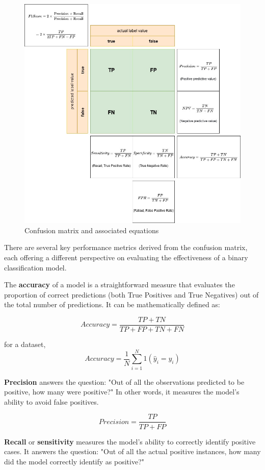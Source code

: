 		\begin{figure}[H]
			\centering
			\includegraphics[width=0.9\linewidth]{img/confusion_matrix}
			\caption{Confusion matrix and associated equations}
			\label{fig:confusionmatrix}
		\end{figure}
		
		
		There are several key performance metrics derived from the confusion matrix, each offering a different perspective on evaluating the effectiveness of a binary classification model.
		
		\bigskip
		
		The \textbf{accuracy} of a model is a straightforward measure that evaluates the proportion of correct predictions (both True Positives and True Negatives) out of the total number of predictions. It can be mathematically defined as:
		
		
		$$Accuracy=\frac{TP+TN}{TP+FP+TN+FN}$$
		
		for a dataset,
		$$
		Accuracy = \frac{1}{N} \sum_{i=1}^{N} 1(\hat{y}_i = y_i)
		$$
		
		
		\textbf{Precision} answers the question: "Out of all the observations predicted to be positive, how many were positive?" In other words, it measures the model's ability to avoid false positives.
		
		$$Precision=\frac{TP}{TP+FP}$$
		
		
		\textbf{Recall} or \textbf{sensitivity} measures the model's ability to correctly identify positive cases. It answers the question: "Out of all the actual positive instances, how many did the model correctly identify as positive?"
		

